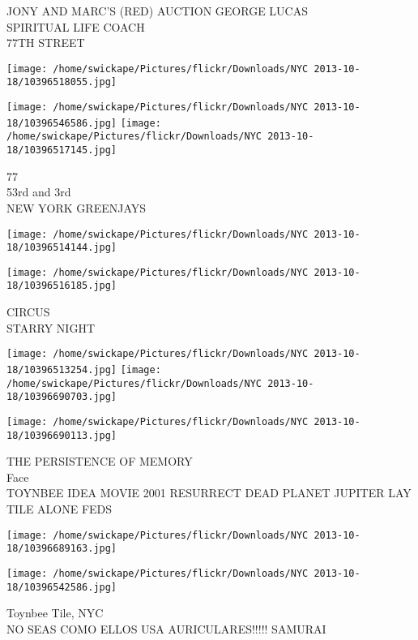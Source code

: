 \documentclass[10pt,letterpaper]{article}
\begin{document}
JONY AND MARC'S (RED) AUCTION GEORGE LUCAS\\
SPIRITUAL LIFE COACH\\
77TH STREET\\
\pagebreak

\texttt{[image: /home/swickape/Pictures/flickr/Downloads/NYC 2013-10-18/10396518055.jpg]}

\vspace{0.25in}
\texttt{[image: /home/swickape/Pictures/flickr/Downloads/NYC 2013-10-18/10396546586.jpg]}
\texttt{[image: /home/swickape/Pictures/flickr/Downloads/NYC 2013-10-18/10396517145.jpg]}

77\\
53rd and 3rd\\
NEW YORK GREENJAYS\\
\pagebreak

\texttt{[image: /home/swickape/Pictures/flickr/Downloads/NYC 2013-10-18/10396514144.jpg]}

\vspace{0.25in}
\texttt{[image: /home/swickape/Pictures/flickr/Downloads/NYC 2013-10-18/10396516185.jpg]}

CIRCUS\\
STARRY NIGHT\\
\pagebreak

\texttt{[image: /home/swickape/Pictures/flickr/Downloads/NYC 2013-10-18/10396513254.jpg]}
\texttt{[image: /home/swickape/Pictures/flickr/Downloads/NYC 2013-10-18/10396690703.jpg]}

\vspace{0.25in}
\texttt{[image: /home/swickape/Pictures/flickr/Downloads/NYC 2013-10-18/10396690113.jpg]}

THE PERSISTENCE OF MEMORY\\
Face\\
TOYNBEE IDEA MOVIE 2001 RESURRECT DEAD PLANET JUPITER LAY TILE ALONE FEDS\\
\pagebreak

\texttt{[image: /home/swickape/Pictures/flickr/Downloads/NYC 2013-10-18/10396689163.jpg]}

\vspace{0.25in}
\texttt{[image: /home/swickape/Pictures/flickr/Downloads/NYC 2013-10-18/10396542586.jpg]}

Toynbee Tile, NYC\\
NO SEAS COMO ELLOS USA AURICULARES!!!!! SAMURAI\\
\pagebreak
\end{document}
